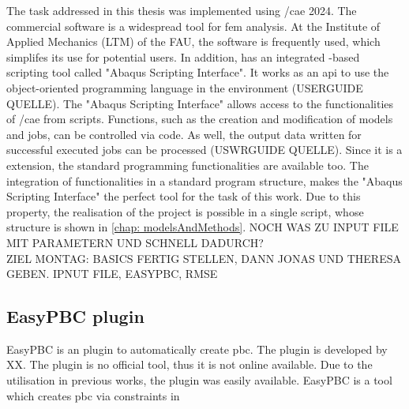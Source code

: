 The task addressed in this thesis was implemented using /\acrshort{cae} 2024. The commercial software is a widespread tool for \acrshort{fem} analysis. At the Institute of Applied Mechanics (LTM) of the FAU, the software is frequently used, which simplifes its use for potential users. In addition,  has an integrated -based scripting tool called "Abaqus Scripting Interface". It works as an \acrfull{api} to use the object-oriented programming language  in the  environment (USERGUIDE QUELLE). The "Abaqus Scripting Interface" allows access to the functionalities of /\acrshort{cae} from scripts. Functions, such as the creation and modification of models and jobs, can be controlled via code. As well, the output data written for successful executed jobs can be processed (USWRGUIDE QUELLE). Since it is a  extension, the standard programming functionalities are available too. The integration of  functionalities in a standard program structure, makes the "Abaqus Scripting Interface" the perfect tool for the task of this work. Due to this property, the realisation of the project is possible in a single script, whose structure is shown in \autoref{chap: modelsAndMethods}. NOCH WAS ZU INPUT FILE MIT PARAMETERN UND SCHNELL DADURCH? \\


ZIEL MONTAG: BASICS FERTIG STELLEN, DANN JONAS UND THERESA GEBEN. IPNUT FILE, EASYPBC, RMSE




\subsection{EasyPBC plugin} \label{subsec: EasPBC}

EasyPBC is an  plugin to automatically create \acrfull{pbc}. The plugin is developed by XX. The plugin is no official tool, thus it is not online available. Due to the utilisation in previous works, the plugin was easily available. EasyPBC is a tool which creates \acrshort{pbc} via constraints in 

